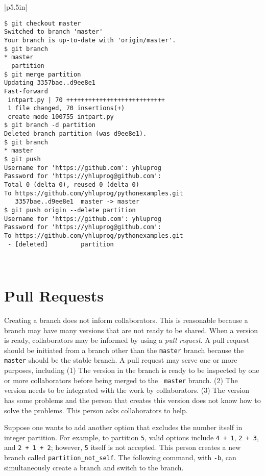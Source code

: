 \vspace{0.2in}
\noindent
\begin{tabular}{|p{5.5in}|}\hline
\begin{verbatim}
$ git checkout master
Switched to branch 'master'
Your branch is up-to-date with 'origin/master'.
$ git branch
* master
  partition
$ git merge partition
Updating 3357bae..d9ee8e1
Fast-forward
 intpart.py | 70 +++++++++++++++++++++++++++
 1 file changed, 70 insertions(+)
 create mode 100755 intpart.py
$ git branch -d partition
Deleted branch partition (was d9ee8e1).
$ git branch
* master
$ git push
Username for 'https://github.com': yhluprog
Password for 'https://yhluprog@github.com': 
Total 0 (delta 0), reused 0 (delta 0)
To https://github.com/yhluprog/pythonexamples.git
   3357bae..d9ee8e1  master -> master
$ git push origin --delete partition
Username for 'https://github.com': yhluprog
Password for 'https://yhluprog@github.com': 
To https://github.com/yhluprog/pythonexamples.git
 - [deleted]         partition
\end{verbatim}
\\ \hline
\end{tabular}
\vspace{0.2in}

\clearpage

\section{Pull Requests}

Creating a branch does not inform collaborators. This is reasonable
because a branch may have many versions that are not ready to be
shared. When a version is ready, collaborators may be informed by
using a {\it pull request}. A pull request should be initiated from a
branch other than the {\tt master} branch because the {\tt master}
should be the stable branch. A pull request may serve one or more
purposes, including (1) The version in the branch is ready to be
inspected by one or more collaborators before being merged to the {\tt
  master} branch. (2) The version needs to be integrated with the work
by collaborators. (3) The version has some problems and the person
that creates this version does not know how to solve the
problems. This person asks collaborators to help.

Suppose one wants to add another option that excludes the number itself in
integer partition. For example, to partition {\tt 5}, valid options include
{\tt 4 + 1}, {\tt 2 + 3}, and {\tt 2 + 1 + 2}; however, {\tt 5} itself is not accepted.
This person creates a new branch called {\tt partition\_not\_self}. 
The following command, with {\tt -b}, can simultaneously create a branch and switch to the
branch.

